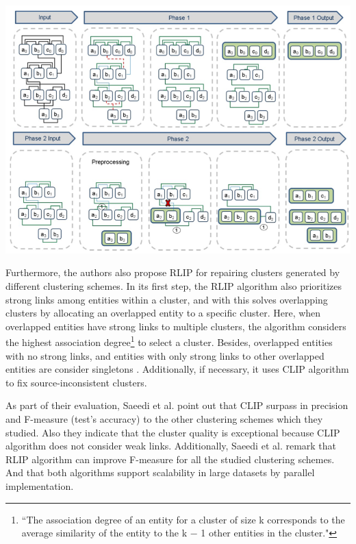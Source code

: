 \documentclass[runningheads]{llncs}
\begin{document}
\begin{center}
\includegraphics[width=1\textwidth]{clip_example.png} 
\label{fig:fig1}
\end{center}

Furthermore, the authors also propose RLIP for repairing clusters generated by different clustering schemes. In its first step, the RLIP algorithm also prioritizes strong links among entities within a cluster, and with this solves overlapping clusters by allocating an overlapped entity to a specific cluster. Here, when overlapped entities have strong links to multiple clusters, the algorithm considers the highest association degree\footnote{``The association degree of an entity for a cluster of size k corresponds to the average similarity of the entity to the k − 1 other entities in the cluster."\cite{Saeedi}} to select a cluster. Besides, overlapped entities with no strong links, and entities with only strong links to other overlapped entities are consider singletons \cite{Saeedi}. Additionally, if necessary, it uses CLIP algorithm to fix source-inconsistent clusters.

As part of their evaluation, Saeedi et al. \cite{Saeedi} point out that CLIP surpass in precision and F-measure (test's accuracy) to the other clustering schemes which they studied. Also they indicate that the cluster quality is exceptional because CLIP algorithm does not consider weak links. Additionally, Saeedi et al. remark that RLIP algorithm can improve F-measure for all the studied clustering schemes. And that both algorithms support scalability in large datasets by parallel implementation.
\end{document}
